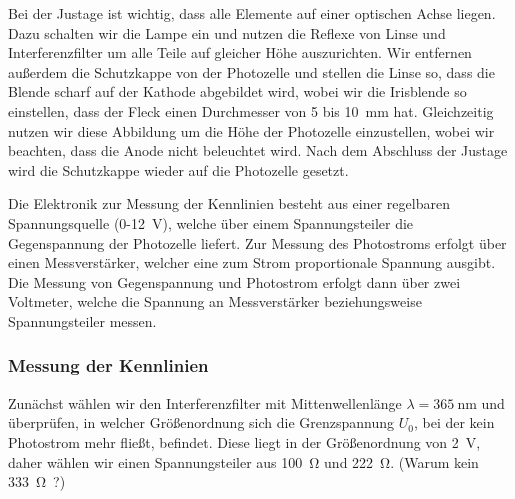 \documentclass[11pt, a4paper]{article}
\numberwithin{equation}{section}
\begin{document}
Bei der Justage ist wichtig, dass alle Elemente auf einer optischen Achse liegen.
Dazu schalten wir die Lampe ein und nutzen die Reflexe von Linse und Interferenzfilter um alle Teile auf gleicher Höhe auszurichten.
Wir entfernen außerdem die Schutzkappe von der Photozelle und stellen die Linse so, dass die Blende scharf auf der Kathode abgebildet wird, wobei wir die Irisblende so einstellen, dass der Fleck einen Durchmesser von \num{5} bis \SI{10}{\milli\metre} hat.
Gleichzeitig nutzen wir diese Abbildung um die Höhe der Photozelle einzustellen, wobei wir beachten, dass die Anode nicht beleuchtet wird.
Nach dem Abschluss der Justage wird die Schutzkappe wieder auf die Photozelle gesetzt.

Die Elektronik zur Messung der Kennlinien besteht aus einer regelbaren Spannungsquelle (\num{0}-\SI{12}{\volt}), welche über einem Spannungsteiler die Gegenspannung der Photozelle liefert.
Zur Messung des Photostroms erfolgt über einen Messverstärker, welcher eine zum Strom proportionale Spannung ausgibt.
Die Messung von Gegenspannung und Photostrom erfolgt dann über zwei Voltmeter, welche die Spannung an Messverstärker beziehungsweise Spannungsteiler messen.

\subsubsection{Messung der Kennlinien}
Zunächst wählen wir den Interferenzfilter mit Mittenwellenlänge $\lambda = \SI{365}{\nano\metre}$ und überprüfen, in welcher Größenordnung sich die Grenzspannung $U_0$, bei der kein Photostrom mehr fließt, befindet.
Diese liegt in der Größenordnung von \SI{2}{\volt}, daher wählen wir einen Spannungsteiler aus \SI{100}{\ohm} und \SI{222}{\ohm}.
(Warum kein \SI{333}{\ohm ?})
\end{document}
